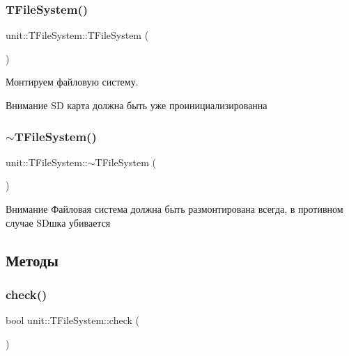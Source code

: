 \subsubsection{\texorpdfstring{T\+File\+System()}{TFileSystem()}}
{\footnotesize\ttfamily unit\+::\+T\+File\+System\+::\+T\+File\+System (\begin{DoxyParamCaption}{ }\end{DoxyParamCaption})}

Монтируем файловую систему. \begin{DoxyAttention}{Внимание}
SD карта должна быть уже проинициализированна 
\end{DoxyAttention}
\mbox{\label{classunit_1_1_t_file_system_a87299dbbdea872b06972f1432ef9ef88}} 
\subsubsection{\texorpdfstring{$\sim$\+T\+File\+System()}{~TFileSystem()}}
{\footnotesize\ttfamily unit\+::\+T\+File\+System\+::$\sim$\+T\+File\+System (\begin{DoxyParamCaption}{ }\end{DoxyParamCaption})\hspace{0.3cm}{\ttfamily [virtual]}}

\begin{DoxyAttention}{Внимание}
Файловая система должна быть размонтирована всегда, в противном случае SD\textquotesingle{}шка убивается 
\end{DoxyAttention}


\subsection{Методы}
\mbox{\label{classunit_1_1_t_file_system_a0737b50d219570ae2e11ea17a32cc85c}} 
\subsubsection{\texorpdfstring{check()}{check()}}
{\footnotesize\ttfamily bool unit\+::\+T\+File\+System\+::check (\begin{DoxyParamCaption}{ }\end{DoxyParamCaption})\hspace{0.3cm}{\ttfamily [virtual]}}



